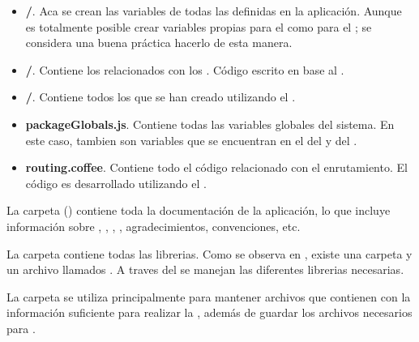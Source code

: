 

\begin{itemize}
	\item
		\textbf{\folderCollections/}. Aca se crean las variables de todas las \collectionsMETEOR definidas en la aplicación. Aunque es totalmente posible crear variables propias para el \clientAS como para el \serverAS; se considera una buena práctica hacerlo de esta manera.
	\item
	 	\textbf{\folderHooks/}. Contiene los \hooksCPT relacionados con los \collectionsMETEOR. Código escrito en base al \packagesAS \nameCollectionHooks.
	\item
		\textbf{\folderSchemas/}. Contiene todos los \schemasDB que se han creado utilizando el \packagesAS \collectionsMETEOR.
	\item
		\textbf{packageGlobals.js}. Contiene todas las variables globales del sistema. En este caso, tambien son variables que se encuentran en el \environmentPL del \clientAS y del \serverAS.
	\item
		\textbf{routing.coffee}. Contiene todo el código relacionado con el enrutamiento. El código es desarrollado utilizando el \packagesAS \nameRouter.
\end{itemize}



La carpeta \folderDocs () contiene toda la documentación de la aplicación, lo que incluye información sobre \deploymentCPT, \packagesAS, \routingAS, \templatesMETEOR, agradecimientos, convenciones, etc.



La carpeta \folderLib contiene todas las librerias. Como se observa en , existe una carpeta y un archivo \jsonNAME llamados \folderBower. A traves del \packagesAS \nameBower se manejan las diferentes librerias necesarias.



La carpeta \privateFolder se utiliza principalmente para mantener archivos \jsonNAME que contienen \collectionsMETEOR con la información suficiente para realizar la \localisationPC, además de guardar los archivos necesarios para \fixturesPC.


